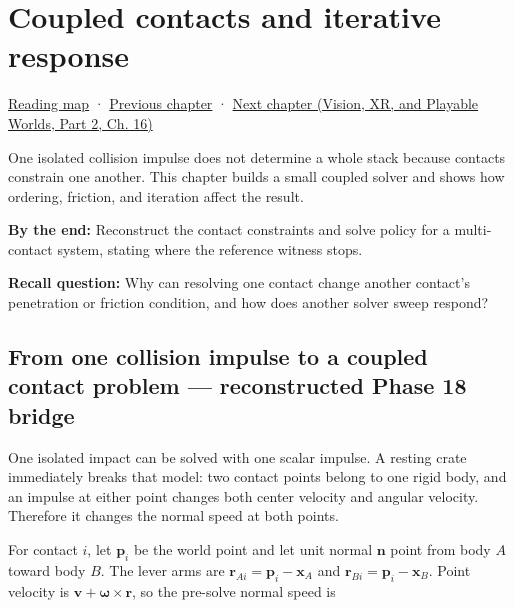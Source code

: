 \chapter{Coupled contacts and iterative response}\label{06-engine-ii-ch040-coupled-contacts-and-iterative-response}\hypertarget{06-engine-ii-ch040}{}\label{stagechapter:06-engine-ii-ch040}

\hypertarget{06-engine-ii-ch040-coupled-contacts-and-iterative-response}{}

\hyperref[volume-reading-map]{Reading map} · \hyperref[06-engine-ii-ch039-composable-timesteps-and-stable-simulation-policy]{Previous chapter} · \href{../07-Vision-XR-and-Playable-Worlds-P02/main.pdf\#nameddest=06-engine-ii-ch041-evidence-tools-and-revisable-design}{Next chapter (Vision, XR, and Playable Worlds, Part 2, Ch. 16)}

One isolated collision impulse does not determine a whole stack because contacts constrain one another. This chapter builds a small coupled solver and shows how ordering, friction, and iteration affect the result.

\textbf{By the end:} Reconstruct the contact constraints and solve policy for a multi-contact system, stating where the reference witness stops.

\textbf{Recall question:} Why can resolving one contact change another contact's penetration or friction condition, and how does another solver sweep respond?

\section{From one collision impulse to a coupled contact problem --- reconstructed Phase 18 bridge}\label{06-engine-ii-ch040-from-one-collision-impulse-to-a-coupled-contact-problem-reconstructed-phase-18-bridge}

\hypertarget{06-engine-ii-ch040-from-one-collision-impulse-to-a-coupled-contact-problem-reconstructed-phase-18-bridge}{}

One isolated impact can be solved with one scalar impulse. A resting crate immediately breaks that model: two contact points belong to one rigid body, and an impulse at either point changes both center velocity and angular velocity. Therefore it changes the normal speed at both points.

For contact \(i\), let \(\mathbf p_i\) be the world point and let unit normal \(\mathbf n\) point from body \(A\) toward body \(B\). The lever arms are \(\mathbf r_{Ai}=\mathbf p_i-\mathbf x_A\) and \(\mathbf r_{Bi}=\mathbf p_i-\mathbf x_B\). Point velocity is \(\mathbf v+\boldsymbol\omega\times\mathbf r\), so the pre-solve normal speed is

